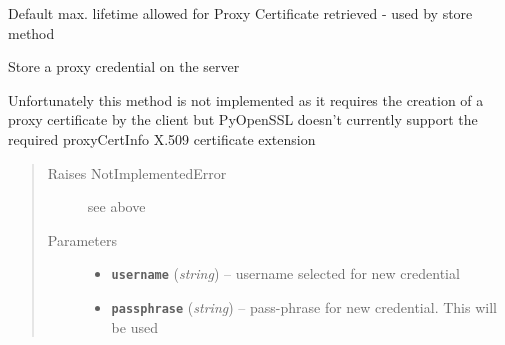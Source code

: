 \documentclass[letterpaper,10pt,english]{sphinxmanual}
\begin{document}
\begin{fulllineitems}
\begin{fulllineitems}
\end{fulllineitems}


\begin{fulllineitems}
\label{client:myproxy.client.MyProxyClient.proxyCertMaxLifetime}
Default max. lifetime allowed for Proxy Certificate retrieved - used by store method

\end{fulllineitems}


\begin{fulllineitems}
\label{client:myproxy.client.MyProxyClient.put}
Store a proxy credential on the server

Unfortunately this method is not implemented as it requires the creation
of a proxy certificate by the client but PyOpenSSL doesn't currently 
support the required proxyCertInfo X.509 certificate extension
\begin{quote}\begin{description}
\item[{Raises NotImplementedError}] \leavevmode
see above

\item[{Parameters}] \leavevmode\begin{itemize}
\item {} 
\textbf{\texttt{username}} (\emph{string}) -- username selected for new credential

\item {} 
\textbf{\texttt{passphrase}} (\emph{string}) -- pass-phrase for new credential.  This will be used

\end{itemize}

\end{description}\end{quote}


\end{fulllineitems}
\end{fulllineitems}
\end{document}
